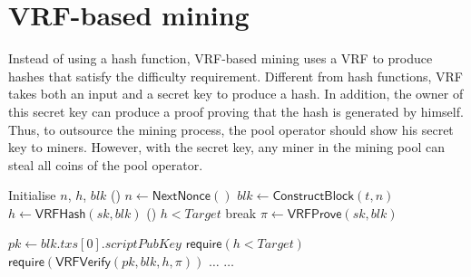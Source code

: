\section{VRF-based mining}
\label{sec:construction}

Instead of using a hash function, VRF-based mining uses a VRF to produce hashes that satisfy the difficulty requirement.
Different from hash functions, VRF takes both an input and a secret key to produce a hash.
In addition, the owner of this secret key can produce a proof proving that the hash is generated by himself.
Thus, to outsource the mining process, the pool operator should show his secret key to miners.
However, with the secret key, any miner in the mining pool can steal all coins of the pool operator.

\begin{algorithm}[]
\caption{$\mathsf{Work}(sk, t, Target)$.}
\label{algo:work}
\SetAlgoLined\DontPrintSemicolon
{}
  Initialise $n$, $h$, $blk$ 
  \While () {$n \gets \mathsf{NextNonce}()$}{
    $blk \gets \mathsf{ConstructBlock}(t, n)$ 
    $h \gets \mathsf{VRFHash}(sk, blk)$ 
    \If () {$h < Target$}{
      break 
    }
  }
  $\pi \gets \mathsf{VRFProve}(sk, blk)$ 
   
\end{algorithm}



\begin{algorithm}[h]
\caption{$\mathsf{Verify}(blk, h, \pi, Target)$}
\label{algo:verify}
\SetAlgoLined\DontPrintSemicolon
$pk \gets blk . txs[0] . scriptPubKey$ 
$\mathsf{require}(h < Target)$ 
$\mathsf{require}(\mathsf{VRFVerify}(pk, blk, h, \pi))$ \;
$\dots$ 
$\dots$ 
\end{algorithm}

